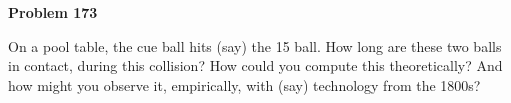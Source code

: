 \documentclass[12pt]{article}
\begin{document}
\begin{pottproblem}
\textbf{Problem 173}

On a pool table, the cue ball hits (say) the 15 ball.
How long are these two balls in contact, during this collision?
How could you compute this theoretically?
And how might you observe it, empirically, with (say) technology from
the 1800s?

\end{pottproblem}
\end{document}
